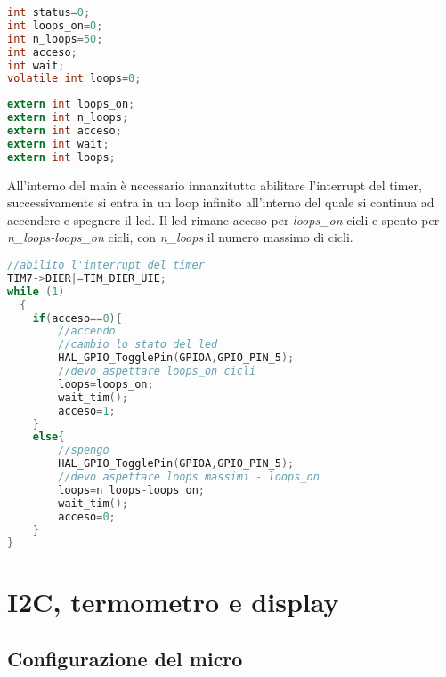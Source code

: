 \documentclass[main.tex]{subfiles}
\begin{document}
\begin{lstlisting}[language=C, caption=Variabili globali interrupt]
int status=0;
int loops_on=0;
int n_loops=50;
int acceso;
int wait;
volatile int loops=0;
\end{lstlisting}

\begin{lstlisting}[language=C,caption=Variabili globali main]
extern int loops_on;
extern int n_loops;
extern int acceso;
extern int wait;
extern int loops;
\end{lstlisting}
All'interno del main è necessario innanzitutto abilitare l'interrupt del timer, successivamente si entra in un loop infinito all'interno del quale si continua ad accendere e spegnere il led. Il led rimane acceso per \textit{loops\_on} cicli e spento per \textit{n\_loops-loops\_on} cicli, con \textit{n\_loops} il numero massimo di cicli. 

\begin{lstlisting}[language=C,caption=Main]
//abilito l'interrupt del timer
TIM7->DIER|=TIM_DIER_UIE;
while (1)
  {
	if(acceso==0){
		//accendo
		//cambio lo stato del led
		HAL_GPIO_TogglePin(GPIOA,GPIO_PIN_5);
		//devo aspettare loops_on cicli
		loops=loops_on;
		wait_tim();
		acceso=1;
	}
	else{
		//spengo
		HAL_GPIO_TogglePin(GPIOA,GPIO_PIN_5);
		//devo aspettare loops massimi - loops_on
		loops=n_loops-loops_on;
		wait_tim();
		acceso=0;
	}
}
\end{lstlisting}


\section{I2C, termometro e display}


\subsection{Configurazione del micro}
\end{document}
